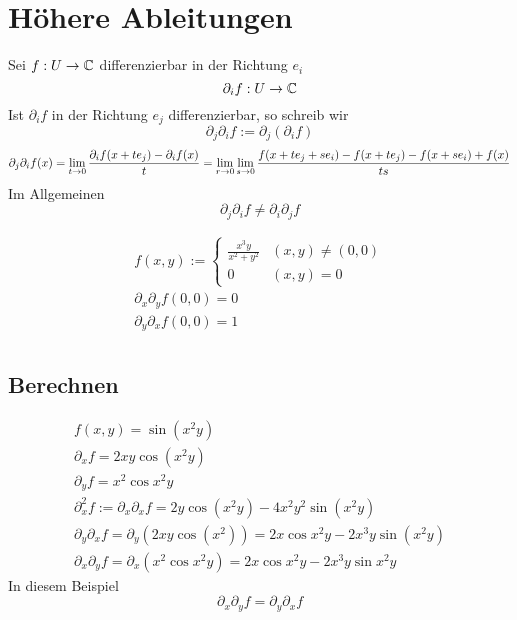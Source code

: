 \section{Höhere Ableitungen}
\begin{Def}
  Sei $f:U\to\mathbb{C}$ differenzierbar in der Richtung $e_i$
  \[\partial_if:U\to\mathbb{C}\]
  Ist $\partial_if$ in der Richtung $e_j$ differenzierbar, so schreib wir
  \[\partial_j\partial_if:=\partial_j(\partial_if)\]
  \[\partial_j\partial_if(x)=\displaystyle\lim_{t\rightarrow0}\frac{\partial_if(x+te_j)-\partial_if(x)}{t}=\displaystyle\lim_{r\rightarrow0}\displaystyle\lim_{s\rightarrow0}\frac{f(x+te_j+se_i)-f(x+te_j)-f(x+se_i)+f(x)}{ts}\]
  Im Allgemeinen
  \[\partial_j\partial_if\neq \partial_i\partial_jf\]
\end{Def}
\begin{Bsp}
  \begin{gather*}
    f(x,y):=\begin{cases}
      \frac{x^3y}{x^2+y^2}&\left( x,y \right)\neq (0,0)\\
      0&(x,y)=0
    \end{cases}\\
    \partial_x\partial_yf(0,0)=0\\
    \partial_y\partial_xf(0,0)=1\\
  \end{gather*}
\end{Bsp}
\subsection{Berechnen}
\begin{Bsp}
  \begin{gather*}
    f(x,y)=\sin(x^2y)\\
    \partial_xf=2xy\cos(x^2y)\\
    \partial_yf=x^2\cos x^2y\\
    \partial^2_xf:=\partial_x\partial_xf=2y\cos(x^2y)-4x^2y^2\sin(x^2y)\\
    \partial_y\partial_xf=\partial_y\left( 2xy\cos(x^2) \right)=2x\cos x^2y-2x^3y\sin(x^2y)\\
    \partial_x\partial_yf=\partial_x\left( x^2\cos x^2y \right)=2x\cos x^2y-2x^3y\sin x^2y
  \end{gather*}
  In diesem Beispiel
  \[\partial_x\partial_yf=\partial_y\partial_xf\]
\end{Bsp}
